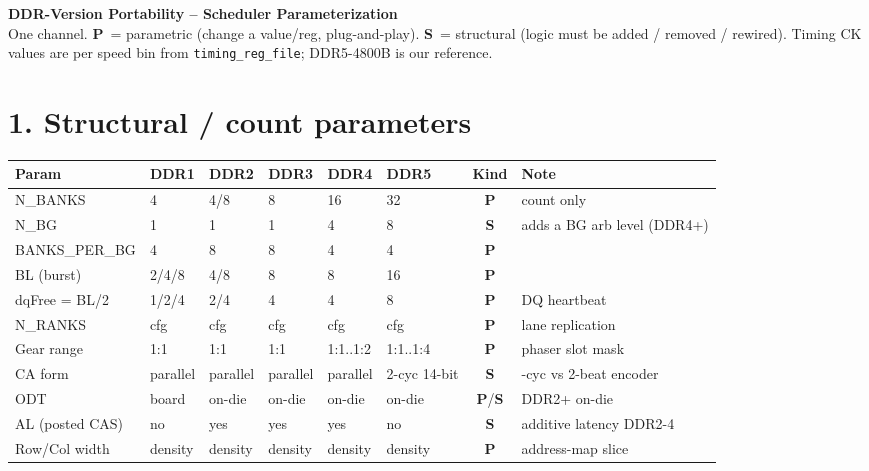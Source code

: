 \documentclass[10pt]{article}
\renewcommand{\P}{\textbf{\textcolor{para}{P}}}
\newcommand{\Su}{\textbf{\textcolor{stru}{S}}}
\begin{document}
\begin{center}
{\Large\textbf{DDR-Version Portability -- Scheduler Parameterization}}\\[2pt]
{\small One channel. \P\ = parametric (change a value/reg, plug-and-play).
\Su\ = structural (logic must be added / removed / rewired). Timing CK values are
per speed bin from \texttt{timing\_reg\_file}; DDR5-4800B is our reference.}
\end{center}

\section*{1. Structural / count parameters}
{\scriptsize
\begin{longtable}{>{\raggedright\arraybackslash}p{2.5cm} p{1.5cm} p{1.5cm} p{1.4cm} p{1.5cm} p{1.7cm} c >{\raggedright\arraybackslash}p{3.5cm}}
\toprule
\textbf{Param} & \textbf{DDR1} & \textbf{DDR2} & \textbf{DDR3} & \textbf{DDR4} & \textbf{DDR5} & \textbf{Kind} & \textbf{Note}\\
\midrule\endhead
N\_BANKS        & 4        & 4/8      & 8         & 16          & 32           & \P  & count only\\
N\_BG           & 1        & 1        & 1         & 4           & 8            & \Su & adds a BG arb level (DDR4+)\\
BANKS\_PER\_BG  & 4        & 8        & 8         & 4           & 4            & \P  & \\
BL (burst)      & 2/4/8    & 4/8      & 8         & 8           & 16           & \P  & \\
dqFree = BL/2   & 1/2/4    & 2/4      & 4         & 4           & 8            & \P  & DQ heartbeat\\
N\_RANKS        & cfg      & cfg      & cfg       & cfg         & cfg          & \P  & lane replication\\
Gear range      & 1:1      & 1:1      & 1:1       & 1:1..1:2    & 1:1..1:4     & \P  & phaser slot mask\\
CA form         & parallel & parallel & parallel  & parallel    & 2-cyc 14-bit & \Su & 1-cyc vs 2-beat encoder\\
ODT             & board    & on-die   & on-die    & on-die      & on-die       & \P/\Su & DDR2+ on-die\\
AL (posted CAS) & no       & yes      & yes       & yes         & no           & \Su & additive latency DDR2-4\\
Row/Col width   & density  & density  & density   & density     & density      & \P  & address-map slice\\
\bottomrule
\end{longtable}}
\end{document}
